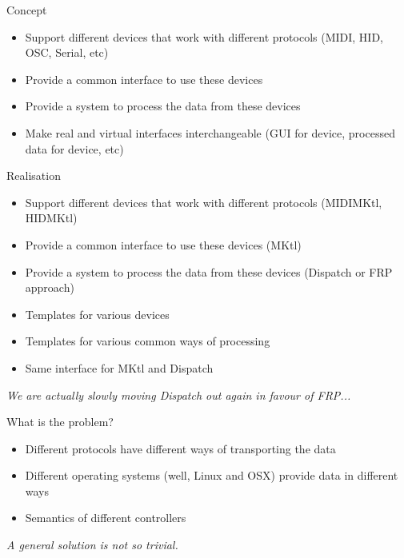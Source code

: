 \documentclass[pdf,slideColor,colorBG,accumulate,total]{prosper}
\begin{document}

\begin{slide}{Concept}
 
 \vspace*{0.5cm}
 \begin{itemize}
  \item Support different devices that work with different protocols (MIDI, HID, OSC, Serial, etc)
  \item Provide a common interface to use these devices
  \item Provide a system to process the data from these devices
  \item Make real and virtual interfaces interchangeable (GUI for device, processed data for device, etc)
 \end{itemize}

\end{slide}

\begin{slide}{Realisation}
 
 \vspace*{0.5cm}
 \begin{itemize}
  \item Support different devices that work with different protocols (MIDIMKtl, HIDMKtl)
  \item Provide a common interface to use these devices (MKtl)
  \item Provide a system to process the data from these devices (Dispatch or FRP approach)
  \item Templates for various devices
  \item Templates for various common ways of processing
  \item Same interface for MKtl and Dispatch
 \end{itemize}

 \vspace*{0.5cm}
 
 \textit{We are actually slowly moving Dispatch out again in favour of FRP...}
 
\end{slide}

\begin{slide}{What is the problem?}

\vspace*{1cm}

\begin{itemize}
 \item Different protocols have different ways of transporting the data
 \item Different operating systems (well, Linux and OSX) provide data in different ways
 \item Semantics of different controllers
\end{itemize}

\vspace*{1cm}

\begin{center}
\textit{ A general solution is not so trivial.}
\end{center}

 
\end{slide}
\end{document}

